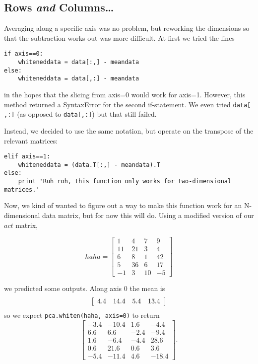 \documentclass{article}
\begin{document}
\subsection{Rows \emph{and} Columns\ldots}
\label{sec:rowsandcols}
Averaging along a specific axis was no problem, but reworking the
dimensions so that the subtraction works out was more difficult.  At
first we tried the lines

\begin{verbatim}
if axis==0:
    whiteneddata = data[:,] - meandata
else:
    whiteneddata = data[,:] - meandata
\end{verbatim}

in the hopes that the slicing from axis=0 would work for axis=1.
However, this method returned a SyntaxError for the second
if-statement.  We even tried \verb|data[ ,:]| (as opposed to
\verb|data[,:]|) but that still failed.

Instead, we decided to use the same notation, but operate on the
transpose of the relevant matrices:

\begin{verbatim}
elif axis==1:
    whiteneddata = (data.T[:,] - meandata).T
else:
    print 'Ruh roh, this function only works for two-dimensional matrices.'
\end{verbatim}

Now, we kind of wanted to figure out a way to make this function work
for an N-dimensional data matrix, but for now this will do.  Using a
modified version of our $act$ matrix,

\[haha= \left[
  \begin{array}{cccc}
    1 & 4 & 7 & 9 \\
    11 & 21 & 3 & 4 \\
    6 & 8 & 1 & 42 \\
    5 & 36 & 6 & 17 \\
    -1 & 3 & 10 & -5
  \end{array} \right] \]

we predicted some outputs.  Along axis 0 the mean
is
\[\left[\begin{array}[c]{cccc}
   4.4 & 14.4 & 5.4 & 13.4
\end{array} \right] \]
so we expect \verb|pca.whiten(haha, axis=0)| to return
\[ \left[
  \begin{array}{cccc}
    -3.4 & -10.4 & 1.6 & -4.4 \\
    6.6 & 6.6 & -2.4 & -9.4 \\
    1.6 & -6.4 & -4.4 & 28.6 \\
    0.6 & 21.6 & 0.6 & 3.6 \\
    -5.4 & -11.4 & 4.6 & -18.4
  \end{array} \right]. \]
\end{document}

